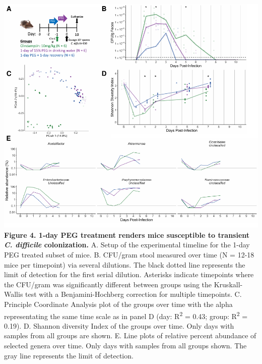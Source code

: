 \documentclass[
  11pt,
]{article}
\begin{document}
\includegraphics{figure_4.pdf} \textbf{Figure 4. 1-day PEG treatment
renders mice susceptible to transient \emph{C. difficile} colonization.}
A. Setup of the experimental timeline for the 1-day PEG treated subset
of mice. B. CFU/gram stool measured over time (N = 12-18 mice per
timepoint) via several dilutions. The black dotted line represents the
limit of detection for the first serial dilution. Asterisks indicate
timepoints where the CFU/gram was significantly different between groups
using the Kruskall-Wallis test with a Benjamini-Hochberg correction for
multiple timepoints. C. Principle Coordinate Analysis plot of the groups
over time with the alpha representating the same time scale as in panel
D (day: R\textsuperscript{2} = 0.43; group: R\textsuperscript{2} =
0.19). D. Shannon diversity Index of the groups over time. Only days
with samples from all groups are shown. E. Line plots of relative
percent abundance of selected genera over time. Only days with samples
from all groups shown. The gray line represents the limit of detection.
\end{document}

